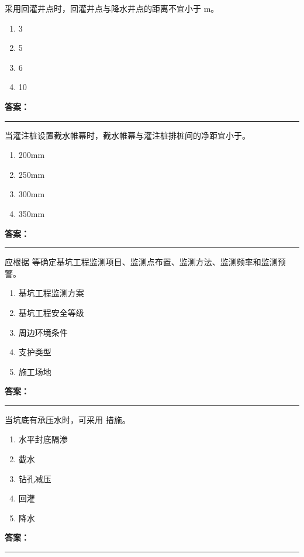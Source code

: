 \documentclass[UTF8,fontset=fandol,11pt]{ctexart}
\newcommand{\answerline}{\textcolor{answerred}{\rule{2.4cm}{0.7pt}}}
\begin{document}
\begin{quizbox}[title={第 20 题}]
采用回灌井点时，回灌井点与降水井点的距离不宜小于 m。\\
\begin{enumerate}[label=\Alph*.]
\item 3
\item 5
\item 6
\item 10
\end{enumerate}
\textbf{\textcolor{answerred}{答案：}} \answerline
\end{quizbox}

\begin{quizbox}[title={第 21 题}]
当灌注桩设置截水帷幕时，截水帷幕与灌注桩排桩间的净距宜小于。\\
\begin{enumerate}[label=\Alph*.]
\item 200mm
\item 250mm
\item 300mm
\item 350mm
\end{enumerate}
\textbf{\textcolor{answerred}{答案：}} \answerline
\end{quizbox}

\begin{quizbox}[title={第 22 题}]
应根据 等确定基坑工程监测项目、监测点布置、监测方法、监测频率和监测预警。\\
\begin{enumerate}[label=\Alph*.]
\item 基坑工程监测方案
\item 基坑工程安全等级
\item 周边环境条件
\item 支护类型
\item 施工场地
\end{enumerate}
\textbf{\textcolor{answerred}{答案：}} \answerline
\end{quizbox}

\begin{quizbox}[title={第 23 题}]
当坑底有承压水时，可采用 措施。\\
\begin{enumerate}[label=\Alph*.]
\item 水平封底隔渗
\item 截水
\item 钻孔减压
\item 回灌
\item 降水
\end{enumerate}
\textbf{\textcolor{answerred}{答案：}} \answerline
\end{quizbox}
\end{document}
